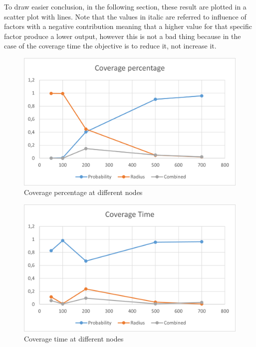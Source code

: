 To draw easier conclusion, in the following section, these result are plotted in a scatter plot with lines. Note that the values in italic are referred to influence of factors with a negative contribution meaning that a higher value for that specific factor produce a lower output, however this is not a bad thing because in the case of the coverage time the objective is to reduce it, not increase it.

\begin{figure}[H]\label{pic:CovPerc}
\centering
    \includegraphics[width= 1\textwidth]{./images/CoveragePercentageWithNodes.png}
    \caption{Coverage percentage at different nodes}
    \label{fig:immagine}
\end{figure}


\begin{figure}[H]
\centering
    \includegraphics[width= 1\textwidth]{./images/CoverageTimeWithNodes.png}
    \caption{Coverage time at different nodes}
    \label{fig:immagine}
\end{figure}

